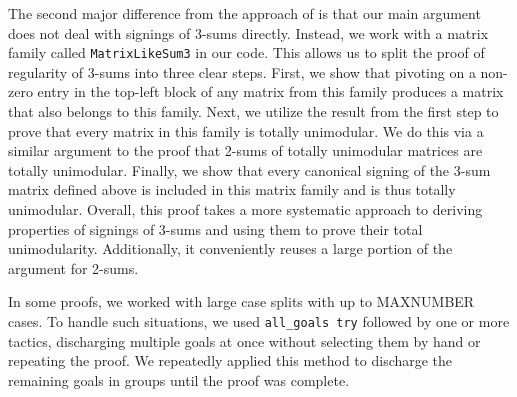 The second major difference from the approach of \cite{Truemper2016} is that our main argument does not deal with signings of 3-sums directly. Instead, we work with a matrix family called \texttt{MatrixLikeSum3} in our code. This allows us to split the proof of regularity of 3-sums into three clear steps. First, we show that pivoting on a non-zero entry in the top-left block of any matrix from this family produces a matrix that also belongs to this family. Next, we utilize the result from the first step to prove that every matrix in this family is totally unimodular. We do this via a similar argument to the proof that 2-sums of totally unimodular matrices are totally unimodular. Finally, we show that every canonical signing of the 3-sum matrix defined above is included in this matrix family and is thus totally unimodular. Overall, this proof takes a more systematic approach to deriving properties of signings of 3-sums and using them to prove their total unimodularity. Additionally, it conveniently reuses a large portion of the argument for 2-sums.

In some proofs, we worked with large case splits with up to MAXNUMBER cases. To handle such situations, we used \texttt{all\_goals try} followed by one or more tactics, discharging multiple goals at once without selecting them by hand or repeating the proof. We repeatedly applied this method to discharge the remaining goals in groups until the proof was complete.
